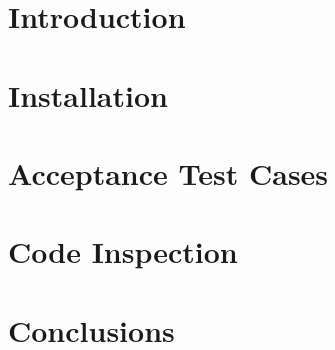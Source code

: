 \setcounter{page}{2}


\newpage
{}
\tableofcontents
\newpage
{}
\listoffigures

\clearpage
\section{Introduction}
\label{sect:introduction}


\clearpage
\section{Installation}
\label{sect:installation}


\clearpage
\section{Acceptance Test Cases}
\label{sect:acceptance}


\clearpage
\section{Code Inspection}
\label{sect:code}


\section{Conclusions}
\label{sect:conclusions}


